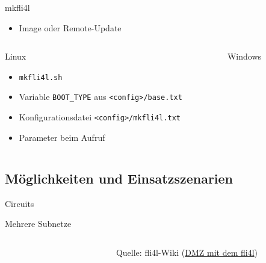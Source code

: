 \documentclass[t]{beamer}
\begin{document}
\begin{frame}{mkfli4l}
    \begin{itemize}
        \item Image oder Remote-Update
    \end{itemize}
    \begin{columns}[t,onlytextwidth]
        \begin{column}{0.5\textwidth}
            \begin{block}{Linux}
                \begin{itemize}
                    \item \texttt{mkfli4l.sh}
                    \item Variable \texttt{BOOT\_TYPE} aus \texttt{<config>/base.txt}
                    \item Konfigurationsdatei \texttt{<config>/mkfli4l.txt}
                    \item Parameter beim Aufruf
                \end{itemize}
            \end{block}
        \end{column}
        \begin{column}{0.5\textwidth}
            \begin{block}{Windows}
                \begin{figure}
                \end{figure}
            \end{block}
        \end{column}
    \end{columns}
\end{frame}

\subsection{Möglichkeiten und Einsatzszenarien}

\begin{frame}{Circuits}
\end{frame}

\begin{frame}{Mehrere Subnetze}
    \begin{columns}[T]
        \begin{column}{0.4\textwidth}
            \begin{figure}
            \end{figure}
        \end{column}
        \begin{column}{0.58\textwidth}
            Quelle: fli4l-Wiki (\href{https://web.nettworks.org/wiki/x/LAAdAQ}{DMZ mit dem fli4l})
        \end{column}
    \end{columns}
\end{frame}
\end{document}
